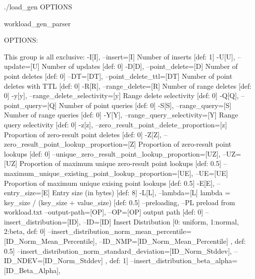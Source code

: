./load_gen {OPTIONS}

    workload_gen_parser

  OPTIONS:

      This group is all exclusive:
        -I[I], --insert=[I]               Number of inserts [def: 1]
        -U[U], --update=[U]               Number of updates [def: 0]
        -D[D], --point_delete=[D]         Number of point deletes [def: 0]
        --DT=[DT], --point_delete_ttl=[DT]   Number of point deletes with TTL [def: 0]
        -R[R], --range_delete=[R]         Number of range deletes [def: 0]
        -y[y],
        --range_delete_selectivity=[y]    Range delete selectivity [def: 0]
        -Q[Q], --point_query=[Q]          Number of point queries [def: 0]
        -S[S], --range_query=[S]          Number of range queries [def: 0]
        -Y[Y],
        --range_query_selectivity=[Y]     Range query selectivity [def: 0]
        -z[z],
        --zero_result_point_delete_proportion=[z]
                                          Proportion of zero-result point
                                          deletes [def: 0]
        -Z[Z],
        --zero_result_point_lookup_proportion=[Z]
                                          Proportion of zero-result point
                                          lookups [def: 0]
        --unique_zero_result_point_lookup_proportion=[UZ],
        --UZ=[UZ]                         Proportion of maximum unique
                                          zero-result point lookups [def: 0.5]
        --maximum_unique_existing_point_lookup_proportion=[UE],
        --UE=[UE]                         Proportion of maximum unique exising
                                          point lookups [def: 0.5]
        -E[E], --entry_size=[E]           Entry size (in bytes) [def: 8]
        -L[L], --lambda=[L]               lambda = key_size / (key_size +
                                          value_size) [def: 0.5]
        --preloading, --PL                preload from workload.txt
        --output-path=[OP], --OP=[OP]     output path [def: 0]
        --insert_distribution=[ID],
        --ID=[ID]                         Insert Distribution [0: uniform,
                                          1:normal, 2:beta, def: 0]
        --insert_distribution_norm_mean_percentile=[ID_Norm_Mean_Percentile],
        --ID_NMP=[ID_Norm_Mean_Percentile]
                                          , def: 0.5]
        --insert_distribution_norm_standard_deviation=[ID_Norm_Stddev],
        --ID_NDEV=[ID_Norm_Stddev]        , def: 1]
        --insert_distribution_beta_alpha=[ID_Beta_Alpha],
